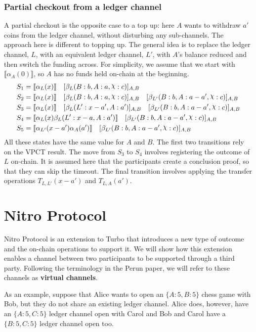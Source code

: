 \documentclass{article}
\DeclareRobustCommand{\rchi}{{\mathpalette\irchi\relax}}
\newcommand{\irchi}[2]{\raisebox{\depth}{$#1\chi$}} %
\theoremstyle{definition}
\newcommand{\adj}[1]{\llbracket #1 \rrbracket}
\newcommand{\enf}[1]{[#1]}
\begin{document}
\subsubsection{Partial checkout from a ledger channel}

A partial checkout is the opposite case to a top up: here $A$ wants to withdraw $a'$ coins from the ledger channel, without disturbing any sub-channels.
The approach here is different to topping up.
The general idea is to replace the ledger channel, $L$, with an equivalent ledger channel, $L'$, with $A$'s balance reduced and then switch the funding across.
For simplicity, we assume that we start with $\adj{\alpha_A(0)}$, so $A$ has no funds held on-chain at the beginning.
\begin{align*}
S_1 &= \adj{\alpha_L(x)} \quad \enf{\beta_L(B: b, A: a, \rchi: c)}_{A, B}  \\
S_2 &= \adj{\alpha_L(x)} \quad \enf{\beta_L(B: b, A: a, \rchi: c)}_{A, B} \quad \enf{\beta_{L'}(B: b, A: a - a', \rchi: c)}_{A, B}\\
S_3 &= \adj{\alpha_L(x)} \quad \enf{\beta_L(L': x-a', A: a')}_{A, B} \quad \enf{\beta_{L'}(B: b, A: a - a', \rchi: c)}_{A, B}\\
S_4 &= \adj{\alpha_L(x)\beta_L(L': x-a, A: a')} \quad \enf{\beta_{L'}(B: b, A: a - a', \rchi: c)}_{A, B}\\
S_5 &= \adj{\alpha_{L'}(x-a')\alpha_A(a')} \quad \enf{\beta_{L'}(B: b, A: a - a', \rchi: c)}_{A, B}
\end{align*}
All these states have the same value for $A$ and $B$.
The first two transitions rely on the VPCT result.
The move from $S_3$ to $S_4$ involves registering the outcome of $L$ on-chain.
It is assumed here that the participants create a conclusion proof, so that they can
skip the timeout.
The final transition involves applying the transfer operations $T_{L, L'}(x-a')$ and $T_{L, A}(a')$.

\section{Nitro Protocol}

Nitro Protocol is an extension to Turbo that introduces a new type of outcome and the on-chain operations to support it. 
We will show how this extension enables a channel between two participants to be supported through a third party.
Following the terminology in the Perun paper, we will refer to these channels as \textbf{virtual channels}.

As an example, suppose that Alice wants to open an $\{A:5, B:5\}$ chess game with Bob, but they do not share an existing ledger channel.
Alice does, however, have an $\{A:5, C:5\}$ ledger channel open with Carol and Bob and Carol have a $\{B:5, C:5\}$ ledger channel open too.
\end{document}
